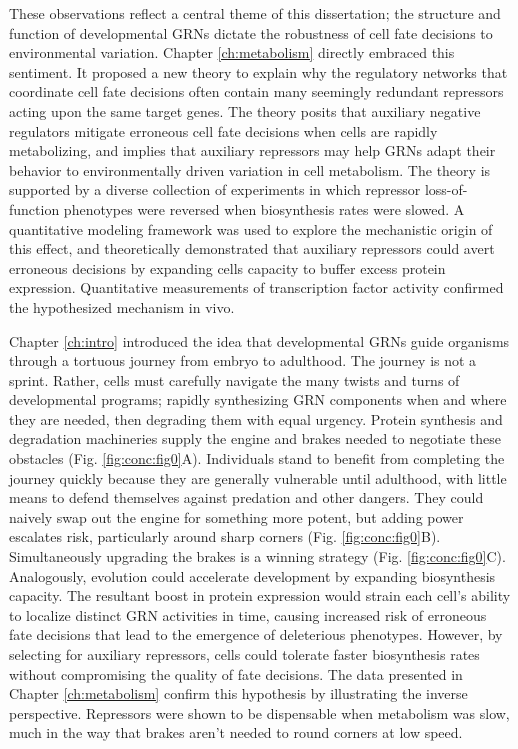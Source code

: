 These observations reflect a central theme of this dissertation; the structure and function of developmental GRNs dictate the robustness of cell fate decisions to environmental variation. Chapter \ref{ch:metabolism} directly embraced this sentiment. It proposed a new theory to explain why the regulatory networks that coordinate cell fate decisions often contain many seemingly redundant repressors acting upon the same target genes. The theory posits that auxiliary negative regulators mitigate erroneous cell fate decisions when cells are rapidly metabolizing, and implies that auxiliary repressors may help GRNs adapt their behavior to environmentally driven variation in cell metabolism. The theory is supported by a diverse collection of experiments in which repressor loss-of-function phenotypes were reversed when biosynthesis rates were slowed. A quantitative modeling framework was used to explore the mechanistic origin of this effect, and theoretically demonstrated that auxiliary repressors could avert erroneous decisions by expanding cells capacity to buffer excess protein expression. Quantitative measurements of transcription factor activity confirmed the hypothesized mechanism in vivo.

Chapter \ref{ch:intro} introduced the idea that developmental GRNs guide organisms through a tortuous journey from embryo to adulthood. The journey is not a sprint. Rather, cells must carefully navigate the many twists and turns of developmental programs; rapidly synthesizing GRN components when and where they are needed, then degrading them with equal urgency. Protein synthesis and degradation machineries supply the engine and brakes needed to negotiate these obstacles (Fig. \ref{fig:conc:fig0}A). Individuals stand to benefit from completing the journey quickly because they are generally vulnerable until adulthood, with little means to defend themselves against predation and other dangers. They could naively swap out the engine for something more potent, but adding power escalates risk, particularly around sharp corners (Fig. \ref{fig:conc:fig0}B). Simultaneously upgrading the brakes is a winning strategy (Fig. \ref{fig:conc:fig0}C). Analogously, evolution could accelerate development by expanding biosynthesis capacity. The resultant boost in protein expression would strain each cell's ability to localize distinct GRN activities in time, causing increased risk of erroneous fate decisions that lead to the emergence of deleterious phenotypes. However, by selecting for auxiliary repressors, cells could tolerate faster biosynthesis rates without compromising the quality of fate decisions. The data presented in Chapter \ref{ch:metabolism} confirm this hypothesis by illustrating the inverse perspective. Repressors were shown to be dispensable when metabolism was slow, much in the way that brakes aren't needed to round corners at low speed.

